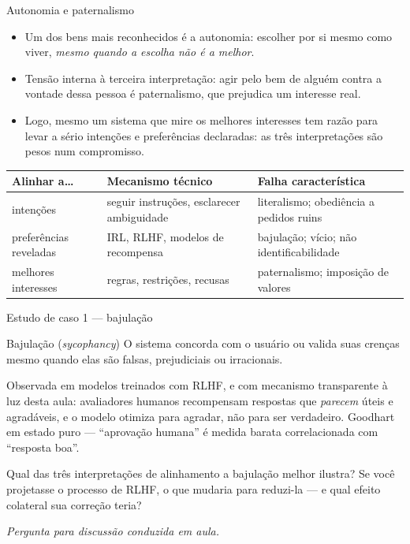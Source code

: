 \documentclass[aspectratio=169, 11pt]{beamer}
\newcommand{\paradiscussao}{\smallskip
  {\footnotesize\color{rlCinza}\itshape Pergunta para discussão conduzida em aula.}}
\begin{document}
\begin{frame}{Autonomia e paternalismo}
  {\small
  \begin{itemize}\setlength{\itemsep}{0.25ex}
    \item Um dos bens mais reconhecidos é a \alert{autonomia}: escolher por si
          mesmo como viver, \emph{mesmo quando a escolha não é a melhor}.
    \item Tensão interna à terceira interpretação: agir pelo bem de alguém
          contra a vontade dessa pessoa é \alert{paternalismo}, que prejudica
          um interesse real.
    \item Logo, mesmo um sistema que mire os melhores interesses tem razão para
          levar a sério intenções e preferências declaradas: as três
          interpretações são pesos num compromisso.
  \end{itemize}}

  \begin{center}\footnotesize
  \begin{tabular}{@{}p{2.4cm}p{4.0cm}p{4.8cm}@{}}
    \toprule
    \textbf{Alinhar a\ldots} & \textbf{Mecanismo técnico} & \textbf{Falha característica} \\
    \midrule
    intenções & seguir instruções, esclarecer ambiguidade & literalismo; obediência a pedidos ruins \\[0.25em]
    preferências reveladas & IRL, RLHF, modelos de recompensa & bajulação; vício; não identificabilidade \\[0.25em]
    melhores interesses & regras, restrições, recusas & paternalismo; imposição de valores \\
    \bottomrule
  \end{tabular}
  \end{center}
\end{frame}

\begin{frame}{Estudo de caso 1 --- bajulação}
  \begin{defbox}{Bajulação (\emph{sycophancy})}
    O sistema concorda com o usuário ou valida suas crenças mesmo quando elas
    são falsas, prejudiciais ou irracionais.
  \end{defbox}

  {\small Observada em modelos treinados com RLHF, e com mecanismo transparente
  à luz desta aula: avaliadores humanos recompensam respostas que
  \emph{parecem} úteis e agradáveis, e o modelo otimiza para agradar, não para
  ser verdadeiro. Goodhart em estado puro --- ``aprovação humana'' é medida
  barata correlacionada com ``resposta boa''.}

  \begin{quizbox}{}
    Qual das três interpretações de alinhamento a bajulação melhor ilustra? Se
    você projetasse o processo de RLHF, o que mudaria para reduzi-la --- e qual
    efeito colateral sua correção teria?
  \end{quizbox}
  \paradiscussao
\end{frame}
\end{document}
